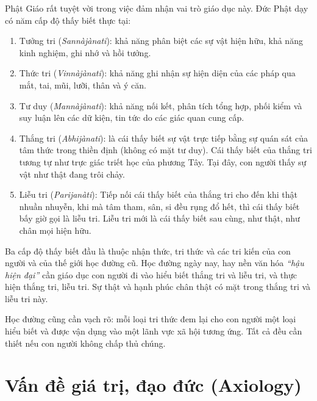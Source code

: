 Phật Giáo rất tuyệt vời trong việc đảm nhận vai trò giáo dục này. Đức Phật dạy có năm cấp độ thấy biết thực tại:

\begin{enumerate}[label=\itshape\arabic*\upshape/]
    \item Tưởng tri (\emph{Sannàjànati}): khả năng phân biệt các sự vật hiện hữu, khả năng kinh nghiệm, ghi nhớ và hồi tưởng.

    \item Thức tri (\emph{Vinnàjànati}): khả năng ghi nhận sự hiện diện của các pháp qua mắt, tai, mũi, lưỡi, thân và ý căn.

    \item Tư duy (\emph{Mannàjànati}): khả năng nối kết, phân tích tổng hợp, phối kiểm và suy luận lên các dữ kiện, tin tức do các giác quan cung cấp.

    \item Thắng tri (\emph{Abhijànati}): là cái thấy biết sự vật trực tiếp bằng sự quán sát của tâm thức trong thiền định (không có mặt tư duy). Cái thấy biết của thắng tri tương tự như trực giác triết học của phương Tây. Tại đây, con người thấy sự vật như thật đang trôi chảy.

    \item Liễu tri (\emph{Parijanàti}): Tiếp nối cái thấy biết của thắng tri cho đến khi thật nhuần nhuyễn, khi mà tâm tham, sân, si đều rụng đổ hết, thì cái thấy biết bấy giờ gọi là liễu tri. Liễu tri mới là cái thấy biết sau cùng, như thật, như chân mọi hiện hữu.
\end{enumerate}

Ba cấp độ thấy biết đầu là thuộc nhận thức, tri thức và các tri kiến của con người và của thế giới học đường cũ. Học đường ngày nay, hay nền văn hóa \emph{``hậu hiện đại''} cần giáo dục con người đi vào hiểu biết thắng tri và liễu tri, và thực hiện thắng tri, liễu tri. Sự thật và hạnh phúc chân thật có mặt trong thắng tri và liễu tri này.

Học đường cũng cần vạch rõ: mỗi loại tri thức đem lại cho con người một loại hiểu biết và được vận dụng vào một lãnh vực xã hội tương ứng. Tất cả đều cần thiết nếu con người không chấp thủ chúng.

\section{Vấn đề giá trị, đạo đức (Axiology)} %
\label{sec:van_de_gia_tri_dao_duc}

